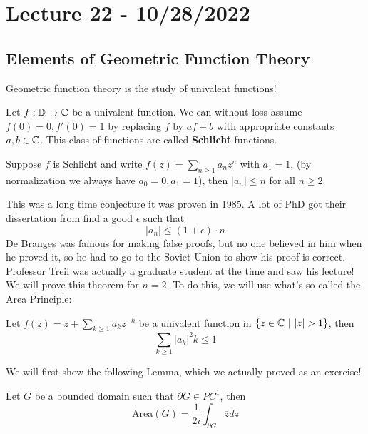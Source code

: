 \section{Lecture 22 - 10/28/2022}

\subsection{Elements of Geometric Function Theory}

Geometric function theory is the study of univalent functions!

\begin{definition}
    Let $f: \mathbb{D} \to \mathbb{C}$ be a univalent function. We can without loss assume $f(0) = 0, f'(0) = 1$ by replacing $f$ by $af + b$ with appropriate constants $a, b \in \mathbb{C}$. This class of functions are called \textbf{Schlicht} functions.
\end{definition}

\begin{theorem}
    Suppose $f$ is Schlicht and write $f(z) = \sum_{n \geq 1} a_n z^n$ with $a_1 = 1$, (by normalization we always have $a_0 = 0, a_1 = 1$), then $|a_n| \leq n$ for all $n \geq 2$.
\end{theorem}

This was a long time conjecture it was proven in 1985. A lot of PhD got their dissertation from find a good $\epsilon$ such that
\[|a_n| \leq (1 + \epsilon) \cdot n\]
De Branges was famous for making false proofs, but no one believed in him when he proved it, so he had to go to the Soviet Union to show his proof is correct. Professor Treil was actually a graduate student at the time and saw his lecture!\\

We will prove this theorem for $n = 2$. To do this, we will use what's so called the Area Principle:

\begin{theorem}
    Let $f(z) = z + \sum_{k \geq 1} a_k z^{-k}$ be a univalent function in $\{z \in \Cbb\ |\ |z| > 1\}$, then
    \[\sum_{k \geq 1} |a_k|^2 k \leq 1\]
\end{theorem}

We will first show the following Lemma, which we actually proved as an exercise!

\begin{lemma}
    Let $G$ be a bounded domain such that $\partial G \in PC^1$, then
    \[\text{Area}(G) = \frac{1}{2i} \int_{\partial G} \overline{z} dz\]
\end{lemma}

